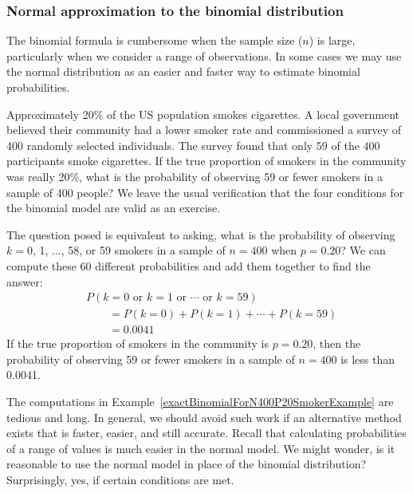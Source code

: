\subsubsection{Normal approximation to the binomial distribution}


The binomial formula is cumbersome when the sample size ($n$) is large, particularly when we consider a range of observations. In some cases we may use the normal distribution as an easier and faster way to estimate binomial probabilities.

\begin{example}{Approximately 20\% of the US population smokes cigarettes. A local government believed their community had a lower smoker rate and commissioned a survey of 400 randomly selected individuals. The survey found that only 59 of the 400 participants smoke cigarettes. If the true proportion of smokers in the community was really 20\%, what is the probability of observing 59 or fewer smokers in a sample of 400 people?}\label{exactBinomialForN400P20SmokerExample}
We leave the usual verification that the four conditions for the binomial model are valid as an exercise.

The question posed is equivalent to asking, what is the probability of observing $k=0$, 1, ..., 58, or 59 smokers in a sample of $n=400$ when $p=0.20$? We can compute these 60 different probabilities and add them together to find the answer:
\begin{align*}
&P(k=0\text{ or }k=1\text{ or }\cdots\text{ or } k=59) \\
	&\qquad= P(k=0) + P(k=1) + \cdots + P(k=59) \\
	&\qquad=0.0041
\end{align*}
If the true proportion of smokers in the community is $p=0.20$, then the probability of observing 59 or fewer smokers in a sample of $n=400$ is less than 0.0041.
\end{example}

The computations in Example~\ref{exactBinomialForN400P20SmokerExample} are tedious and long. In general, we should avoid such work if an alternative method exists that is faster, easier, and still accurate. Recall that calculating probabilities of a range of values is much easier in the normal model. We might wonder, is it reasonable to use the normal model in place of the binomial distribution? Surprisingly, yes, if certain conditions are met.

